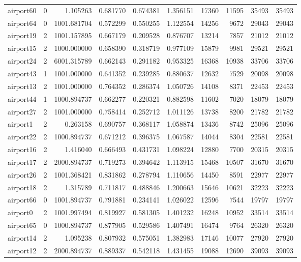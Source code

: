 \begin{longtable}{|l|r|r|r|r|r|r|r|r|r|}
airport60 & 0 & 1.105263 & 0.681770 & 0.674381 & 1.356151 & 17360 & 11595 & 35493 & 35493 \\
airport64 & 0 & 1001.681704 & 0.572299 & 0.550255 & 1.122554 & 14256 & 9672 & 29043 & 29043 \\
airport19 & 2 & 1001.157895 & 0.667179 & 0.209528 & 0.876707 & 13214 & 7857 & 21012 & 21012 \\
airport15 & 2 & 1000.000000 & 0.658390 & 0.318719 & 0.977109 & 15879 & 9981 & 29521 & 29521 \\
airport24 & 2 & 6001.315789 & 0.662143 & 0.291182 & 0.953325 & 16368 & 10938 & 33706 & 33706 \\
airport43 & 1 & 1001.000000 & 0.641352 & 0.239285 & 0.880637 & 12632 & 7529 & 20098 & 20098 \\
airport13 & 2 & 1001.000000 & 0.764352 & 0.286374 & 1.050726 & 14108 & 8371 & 22453 & 22453 \\
airport44 & 1 & 1000.894737 & 0.662277 & 0.220321 & 0.882598 & 11602 & 7020 & 18079 & 18079 \\
airport27 & 2 & 1001.000000 & 0.758414 & 0.252712 & 1.011126 & 13738 & 8200 & 21782 & 21782 \\
airport1 & 2 & 0.263158 & 0.690757 & 0.368117 & 1.058874 & 13436 & 8742 & 25096 & 25096 \\
airport22 & 2 & 1000.894737 & 0.671212 & 0.396375 & 1.067587 & 14044 & 8304 & 22581 & 22581 \\
airport16 & 2 & 1.416040 & 0.666493 & 0.431731 & 1.098224 & 12880 & 7700 & 20315 & 20315 \\
airport17 & 2 & 2000.894737 & 0.719273 & 0.394642 & 1.113915 & 15468 & 10507 & 31670 & 31670 \\
airport26 & 2 & 1001.368421 & 0.831862 & 0.278794 & 1.110656 & 14450 & 8591 & 22977 & 22977 \\
airport18 & 2 & 1.315789 & 0.711817 & 0.488846 & 1.200663 & 15646 & 10621 & 32223 & 32223 \\
airport66 & 0 & 1001.894737 & 0.791881 & 0.234141 & 1.026022 & 12596 & 7544 & 19797 & 19797 \\
airport0 & 2 & 1001.997494 & 0.819927 & 0.581305 & 1.401232 & 16248 & 10952 & 33514 & 33514 \\
airport65 & 0 & 1000.894737 & 0.877905 & 0.529586 & 1.407491 & 16474 & 9764 & 26320 & 26320 \\
airport14 & 2 & 1.095238 & 0.807932 & 0.575051 & 1.382983 & 17146 & 10077 & 27920 & 27920 \\
airport12 & 2 & 2000.894737 & 0.889337 & 0.542118 & 1.431455 & 19088 & 12690 & 39093 & 39093 \\

\end{longtable}
